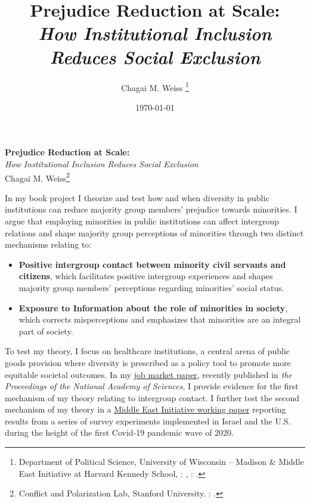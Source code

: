 \documentclass[12pt]{article}
\theoremstyle{plain}
\begin{document}
\singlespace
\title{\large{\textbf{Prejudice Reduction at Scale: \\}
{\emph{How Institutional Inclusion Reduces Social Exclusion}}}}



\author{Chagai M. Weiss \thanks{Department of Political Science, University of Wisconsin -- Madison \& Middle East Initiative at Harvard Kennedy School, \faEnvelopeO: \href{mailto:cmweiss3@wisc.edu}{}, \faGlobe: \href{www.chagaiweiss.com}{}.}}


\date{\today\\}

\onehalfspacing
\begin{center}
\Large{\textbf{Prejudice Reduction at Scale:} \\}
\large{{\emph{How Institutional Inclusion Reduces Social Exclusion}}\\
Chagai M. Weiss}\footnote{Conflict and Polarization Lab, Stanford University. \faGlobe: \href{www.chagaiweiss.com}{}.}
\end{center}


\noindent In my book project I theorize and test how and when diversity in public institutions can reduce majority group members' prejudice towards minorities. I argue that employing minorities in public institutions can affect intergroup relations and shape majority group perceptions of minorities through two distinct mechanisms relating to:


\begin{itemize}
\item \textbf{Positive intergroup contact between minority civil servants and citizens}, which facilitates positive intergroup experiences and shapes majority group members' perceptions regarding minorities' social status.
\item \textbf{Exposure to Information about the role of minorities in society}, which corrects misperceptions and emphasizes that minorities are an integral part of society.
\end{itemize}


To test my theory, I focus on healthcare institutions, a central arena of public goods provision where diversity is prescribed as a policy tool to promote more equitable societal outcomes. In my \href{https://www.pnas.org/doi/10.1073/pnas.2022634118}{job market paper}, recently published in \emph{the Proceedings of the National Academy of Sciences}, I provide evidence for the first mechanism of my theory relating to intergroup contact. I further test the second mechanism of my theory in a \href{https://www.chagaiweiss.com/papers/inprogress/mei_diveristy.pdf}{Middle East Initiative working paper} reporting results from a series of survey experiments implemented in Israel and the U.S. during the height of the first Covid-19 pandemic wave of 2020.
\end{document}
